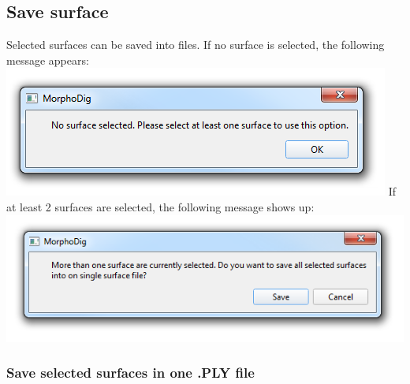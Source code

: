\subsection{Save surface}
Selected surfaces can be saved into files. If no surface is selected, the following message appears:\\
\includegraphics[scale=0.5]{images/07/surface/no_surface_selected.png}
If at least 2 surfaces are selected, the following message shows up:\\
\includegraphics[scale=0.5]{images/07/surface/at_least_2_surfaces_selected.png}

\subsubsection{Save selected surfaces in one .PLY file}

